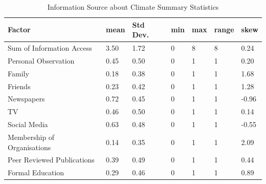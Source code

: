 \begin{center}
\begin{table}[H]
    \centering
    \begin{tabular}{|l|l|l|l|l|l|l|}
    \hline
        \textbf{Factor} & \textbf{mean} & \textbf{Std Dev}. & \textbf{ min} & \textbf{max} & \textbf{ range} & \textbf{skew}  \\ \hline
        
      Sum of Information Access & 3.50 & 1.72 & 0 & 8 & 8 & 0.24 \\ \hline
        Personal Observation  & 0.45 & 0.50 & 0 & 1 & 1 & 0.20 \\ \hline
        Family & 0.18 & 0.38 & 0 & 1 & 1 & 1.68  \\ \hline
        Friends & 0.23 & 0.42 & 0 & 1 & 1 & 1.28  \\ \hline
        Newspapers & 0.72 & 0.45 & 0 & 1 & 1 & -0.96 \\ \hline
        TV & 0.46 & 0.50 & 0 & 1 & 1 & 0.14 \\ \hline
        Social Media & 0.63 & 0.48 & 0 & 1 & 1 & -0.55 \\ \hline
        Membership of Organisations & 0.14 & 0.35 & 0 & 1 & 1 & 2.09 \\ \hline
       Peer Reviewed Publications & 0.39 & 0.49 & 0 & 1 & 1 & 0.44 \\ \hline
        Formal Education & 0.29 & 0.46 & 0 & 1 & 1 & 0.89 \\ \hline
        
         \end{tabular}
    \caption{Information Source about Climate Summary Statistics }{}
\label{table:sum_stats_info_climate_access}
\end{table}
\end{center}

